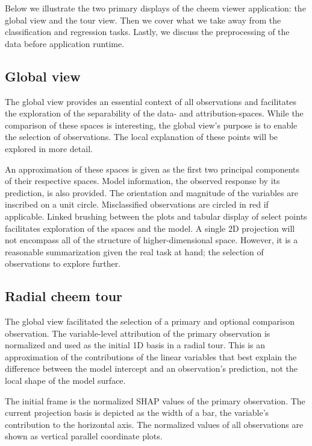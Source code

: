 \documentclass[
]{article}
\begin{document}
Below we illustrate the two primary displays of the cheem viewer
application: the global view and the tour view. Then we cover what we
take away from the classification and regression tasks. Lastly, we
discuss the preprocessing of the data before application runtime.

\hypertarget{global-view}{%
\subsection{Global view}\label{global-view}}

The global view provides an essential context of all observations and
facilitates the exploration of the separability of the data- and
attribution-spaces. While the comparison of these spaces is interesting,
the global view's purpose is to enable the selection of observations.
The local explanation of these points will be explored in more detail.

An approximation of these spaces is given as the first two principal
components of their respective spaces. Model information, the observed
response by its prediction, is also provided. The orientation and
magnitude of the variables are inscribed on a unit circle. Misclassified
observations are circled in red if applicable. Linked brushing between
the plots and tabular display of select points facilitates exploration
of the spaces and the model. A single 2D projection will not encompass
all of the structure of higher-dimensional space. However, it is a
reasonable summarization given the real task at hand; the selection of
observations to explore further.

\hypertarget{radial-cheem-tour}{%
\subsection{Radial cheem tour}\label{radial-cheem-tour}}

The global view facilitated the selection of a primary and optional
comparison observation. The variable-level attribution of the primary
observation is normalized and used as the initial 1D basis in a radial
tour. This is an approximation of the contributions of the linear
variables that best explain the difference between the model intercept
and an observation's prediction, not the local shape of the model
surface.

The initial frame is the normalized SHAP values of the primary
observation. The current projection basis is depicted as the width of a
bar, the variable's contribution to the horizontal axis. The normalized
values of all observations are shown as vertical parallel coordinate
plots.
\end{document}
